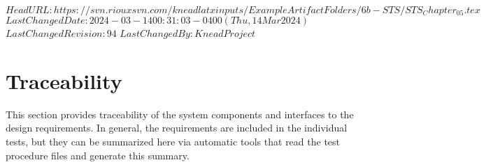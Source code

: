 \svnidlong
{$HeadURL: https://svn.riouxsvn.com/kneadlatxinputs/ExampleArtifactFolders/6b-STS/STS_Chapter_05.tex $}
{$LastChangedDate: 2024-03-14 00:31:03 -0400 (Thu, 14 Mar 2024) $}
{$LastChangedRevision: 94 $}
{$LastChangedBy: KneadProject $}


\chapter{Traceability}
\label{loc:Traceability}
% 

This section provides traceability of the system components and interfaces to the design requirements.
In general, the requirements are included in the individual tests, but they can be summarized here via automatic tools that read the test procedure files and generate this summary.
